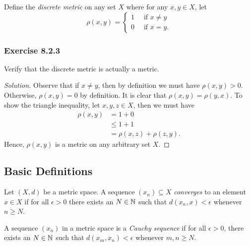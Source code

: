 Define the \textit{discrete metric} on any set \( X  \) where for any \( x, y \in X  \), let 
\[  \rho (x,y) = 
\begin{cases}
    1 \  &\text{ if } x \neq y \\
    0 \ &\text{ if } x = y.
\end{cases}  \]

\subsubsection{Exercise 8.2.3} Verify that the discrete metric is actually a metric.
\begin{proof}[Solution]
Observe that if \( x \neq y  \), then by definition we must have \( \rho(x,y) > 0  \). Otherwise, \( \rho(x,y) = 0  \) by definition. It is clear that \( \rho(x,y) = \rho(y,x) \). To show the triangle inequality, let \( x,y,z \in X  \), then we must have 
\begin{align*}
    \rho(x,y) &= 1 + 0   \\
              &\leq 1 + 1 \\
              &= \rho(x,z) + \rho(z,y). 
\end{align*}
Hence, \( \rho(x,y)  \) is a metric on any arbitrary set \(  X \).
\end{proof}

\subsection{Basic Definitions}

\begin{definition}
Let \( (X,d)  \) be a metric space. A sequence \( (x_{n}) \subseteq  X  \) \textit{converges} to an element \( x \in X  \) if for all \( \epsilon > 0  \) there exists an \( N \in \mathbb{N}  \) such that \( d(x_{n} ,x )  < \epsilon \) whenever \( n \geq N  \).
\end{definition}


\begin{definition}
A sequence \( (x_{n}) \) in a metric space is a \textit{Cauchy sequence} if for all \( \epsilon > 0  \), there exists an \( N \in \mathbb{N}  \) such that \( d(x_{m}, x_{n}) < \epsilon \) whenever \( m, n \geq N  \).
\end{definition} 

